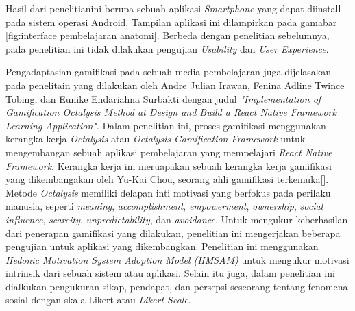 Hasil dari penelitianini berupa sebuah aplikasi \textit{Smartphone} yang dapat diinstall pada sistem operasi Android.
Tampilan aplikasi ini dilampirkan pada gamabar \ref*{fig:interface pembelajaran anatomi}.
Berbeda dengan penelitian sebelumnya, pada penelitian ini tidak dilakukan pengujian \textit{Usability} dan \textit{User Experience}.

Pengadaptasian gamifikasi pada sebuah media pembelajaran juga dijelasakan pada penelitain yang dilakukan oleh Andre Julian Irawan, Fenina Adline Twince Tobing, dan Eunike Endariahna Surbakti
dengan judul \textit{"Implementation of Gamification Octalysis Method at Design and Build a React Native Framework Learning Application"}.
Dalam penelitian ini, proses gamifikasi menggunakan kerangka kerja \textit{Octalysis} atau \textit{Octalysis Gamification Framework} untuk mengembangan sebuah aplikasi pembelajaran yang mempelajari \textit{React Native Framework}.
Kerangka kerja ini meruapakan sebuah kerangka kerja gamifikasi yang dikembangakan oleh Yu-Kai Chou, seorang ahli gamifikasi terkemuka[].
Metode \textit{Octalysis} memiliki delapan inti motivasi yang berfokus pada perilaku manusia, seperti \textit{meaning}, \textit{accomplishment}, \textit{empowerment}, \textit{ownership}, \textit{social influence}, \textit{scarcity}, \textit{unpredictability}, dan \textit{avoidance}.
Untuk mengukur keberhasilan dari penerapan gamifikasi yang dilakukan, penelitian ini mengerjakan beberapa pengujian untuk aplikasi yang dikembangkan.
Penelitian ini menggunakan \textit{Hedonic Motivation System Adoption Model (HMSAM)} untuk mengukur motivasi intrinsik dari sebuah sistem atau aplikasi.
Selain itu juga, dalam penelitian ini dialkukan pengukuran sikap, pendapat, dan persepsi seseorang tentang fenomena sosial dengan skala Likert atau \textit{Likert Scale}.
